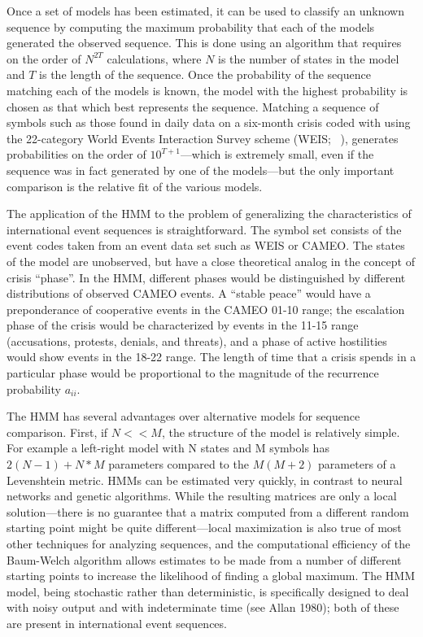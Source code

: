\documentclass[graybox]{svmult}
\begin{document}
Once a set of models has been estimated, it can be used to classify an unknown sequence by
computing the maximum probability that each of the models generated the observed sequence.
This is done using an algorithm that requires on the order of $N^{2T}$ calculations, where $N$ is the
number of states in the model and $T$ is the length of the sequence. Once the probability of the
sequence matching each of the models is known, the model with the highest probability is chosen
as that which best represents the sequence. Matching a sequence of symbols such as those found
in daily data on a six-month crisis coded with using the 22-category World Events Interaction
Survey scheme (WEIS; ~\cite{McClelland76}), generates probabilities on the order of $10^{T+1}$---which
is extremely small, even if the sequence was in fact generated by one of the models---but the only
important comparison is the relative fit of the various models.

The application of the HMM to the problem of generalizing the characteristics of
international event sequences is straightforward. The symbol set consists of the event codes
taken from an event data set such as WEIS or CAMEO. The states of the model are unobserved,
but have a close theoretical analog in the concept of crisis ``phase''. In the
HMM, different phases would be distinguished by different distributions of observed CAMEO
events. A ``stable peace'' would have a preponderance of cooperative events in the CAMEO 01-10
range; the escalation phase of the crisis would be characterized by events in the 11-15 range
(accusations, protests, denials, and threats), and a phase of active hostilities would show events
in the 18-22 range. The length of time that a crisis spends in a particular phase would be
proportional to the magnitude of the recurrence probability $a_{ii}$.

The HMM has several advantages over alternative models for sequence comparison. First, if
$N<<M$, the structure of the model is relatively simple. For example a left-right model with N
states and M symbols has $2(N-1) + N*M$ parameters compared to the $M(M+2)$ parameters of a
Levenshtein metric. HMMs can be estimated very quickly, in contrast to neural networks and
genetic algorithms. While the resulting matrices are only a local solution---there is no guarantee
that a matrix computed from a different random starting point might be quite different---local
maximization is also true of most other techniques for analyzing sequences, and the computational
efficiency of the Baum-Welch algorithm allows estimates to be made from a number of different
starting points to increase the likelihood of finding a global maximum. The HMM model, being
stochastic rather than deterministic, is specifically designed to deal with noisy output and with
indeterminate time (see Allan 1980); both of these are present in international event sequences.
\end{document}
